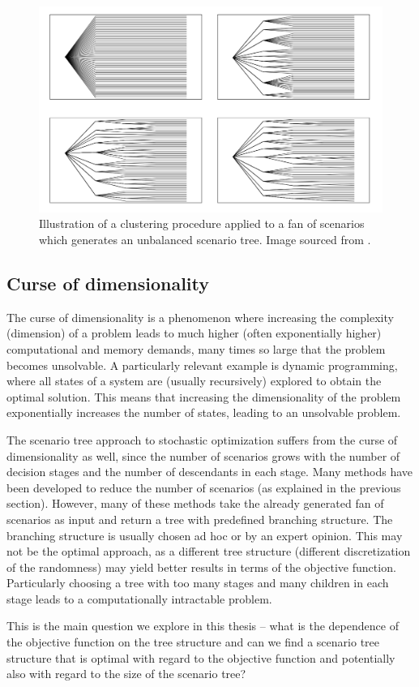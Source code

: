 \begin{figure}
  \includegraphics[width=\linewidth]{../img/fan_of_scenarios_clustering.png}
  \caption{Illustration of a clustering procedure applied to a fan of scenarios which generates an unbalanced scenario tree.  Image sourced from \cite[Figure 5]{fan_of_scenarios}.}
  \label{fig:fan_of_scenarios_clustering}
\end{figure}
\subsection{Curse of dimensionality}
\label{section:curse_od_dimensionality}
The curse of dimensionality is a phenomenon where increasing the complexity (dimension) of a problem leads to much higher (often exponentially higher) computational and memory demands, many times so large that the problem becomes unsolvable. A particularly relevant example is dynamic programming, where all states of a system are (usually recursively) explored to obtain the optimal solution. This means that increasing the dimensionality of the problem exponentially increases the number of states, leading to an unsolvable problem.

The scenario tree approach to stochastic optimization suffers from the curse of dimensionality as well, since the number of scenarios grows with the number of decision stages and the number of descendants in each stage. Many methods have been developed to reduce the number of scenarios (as explained in the previous section). However, many of these methods take the already generated fan of scenarios as input and return a tree with predefined branching structure. The branching structure is usually chosen ad hoc or by an expert opinion. This may not be the optimal approach, as a different tree structure (different discretization of the randomness) may yield better results in terms of the objective function. Particularly choosing a tree with too many stages and many children in each stage leads to a computationally intractable problem.

This is the main question we explore in this thesis -- what is the dependence of the objective function on the tree structure and can we find a scenario tree structure that is optimal with regard to the objective function and potentially also with regard to the size of the scenario tree?